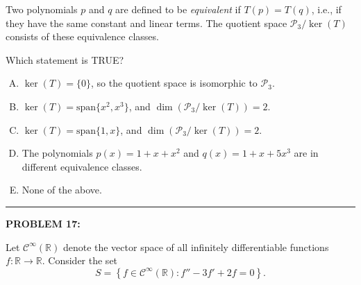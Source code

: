\documentclass[12pt]{amsart}
\newcommand{\divider}{
  \vspace{-1em} %
  \noindent
  \raisebox{-0.15ex}{\textbullet}%
  \hspace{0.5em}%
  \rule[0.5ex]{0.95\textwidth}{1.0pt}%
  \hspace{0.5em}%
  \raisebox{-0.15ex}{\textbullet}%
  \vspace{0em} %
}
\begin{document}
Two polynomials $p$ and $q$ are defined to be \emph{equivalent} if $T(p) = T(q)$, i.e., if they have the same constant and linear terms. The quotient space $\mathcal{P}_3 / \ker(T)$ consists of these equivalence classes.

Which statement is TRUE?

\begin{enumerate}[(A)]
\item $\ker(T) = \{0\}$, so the quotient space is isomorphic to $\mathcal{P}_3$.
\item $\ker(T) = \text{span}\{x^2, x^3\}$, and $\dim(\mathcal{P}_3/\ker(T)) = 2$.
\item $\ker(T) = \text{span}\{1, x\}$, and $\dim(\mathcal{P}_3/\ker(T)) = 2$.
\item The polynomials $p(x) = 1 + x + x^2$ and $q(x) = 1 + x + 5x^3$ are in different equivalence classes.
\item None of the above.
\end{enumerate}



\divider

{\bf PROBLEM 17:}

Let $\mathcal{C}^\infty(\mathbb{R})$ denote the vector space of all infinitely differentiable functions $f: \mathbb{R} \to \mathbb{R}$. Consider the set
$$S = \left\{ f \in \mathcal{C}^\infty(\mathbb{R}) : f'' - 3f' + 2f = 0 \right\}.$$
\end{document}
